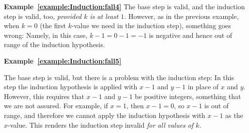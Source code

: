 \textbf{Example~\ref{example:Induction:fall4}}
The base step is valid, and the induction step is valid, too,
\emph{provided $k$ is at least $1$.} However, as in the previous example, 
when $k=0$ (the first $k$-value we need in the induction step), something goes wrong:
Namely, in this case, $k-1=0-1=-1$ is negative and hence out of range of 
the induction hypothesis.

\textbf{Example~\ref{example:Induction:fall5}}

The base step is valid, 
but there is a problem with the induction step: In this step
the induction hypothesis is applied with $x-1$ and $y-1$ in place
of $x$ and $y$. However, this requires that $x-1$ and $y-1$ be positive
integers, something that we are not assured.
For example, if $x=1$, then $x-1=0$, so $x-1$ is out of range, and therefore we
cannot apply the induction hypothesis with $x-1$ as the $x$-value. 
This renders the induction step invalid \emph{for all values of $k$}.








